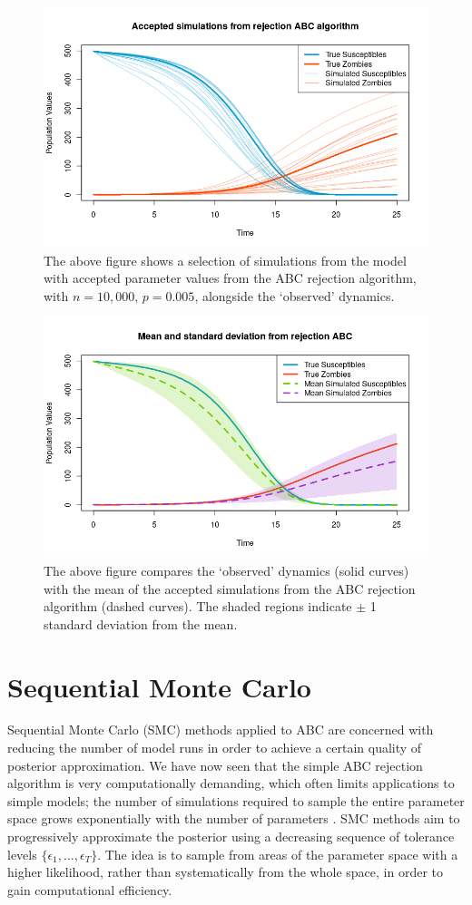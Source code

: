 \documentclass[]{article}
\begin{document}
\begin{figure}[H]
\centering
\includegraphics[width=0.8\linewidth]{../Figures/rej_ABC_simulations}
\caption{The above figure shows a selection of simulations from the model with accepted parameter values from the ABC rejection algorithm, with $n=10,000$, $p=0.005$, alongside the `observed' dynamics.}
\label{rej_abc_acc_simulations}
\end{figure}

\begin{figure}[H]
	\centering
	\includegraphics[width=0.8\linewidth]{../Figures/rej_abc_sd_bands}
	\caption{The above figure compares the `observed' dynamics (solid curves) with the mean of the accepted simulations from the ABC rejection algorithm (dashed curves). The shaded regions indicate $\pm$ 1 standard deviation from the mean.}
	\label{rej_abc_sd}
\end{figure}




\section{Sequential Monte Carlo}

Sequential Monte Carlo (SMC) methods applied to ABC are concerned with reducing the number of model runs in order to achieve a certain quality of posterior approximation. We have now seen that the simple ABC rejection algorithm is very computationally demanding, which often limits applications to simple models; the number of simulations required to sample the entire parameter space grows exponentially with the number of parameters \citep{RN32}. SMC methods aim to progressively approximate the posterior using a decreasing sequence of tolerance levels $\{\epsilon_1, ..., \epsilon_T\}$. The idea is to sample from areas of the parameter space with a higher likelihood, rather than systematically from the whole space, in order to gain computational efficiency.
\end{document}
